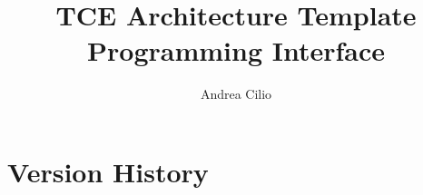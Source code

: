 \documentclass[twoside]{tce}
\begin{document}
\author{Andrea Cilio}
\title{TCE Architecture Template Programming Interface}
\maketitle

\newcommand{\parm}[1]{\textsl{#1\/}}

\chapter*{Version History}
\end{document}
